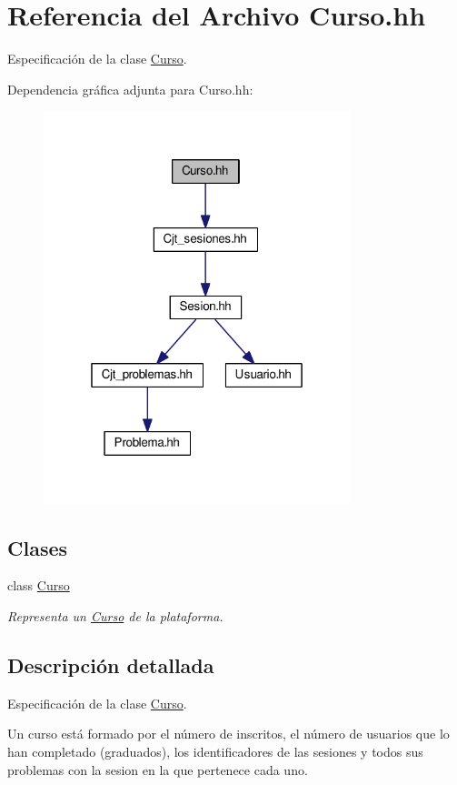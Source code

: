 \hypertarget{_curso_8hh}{}\section{Referencia del Archivo Curso.\+hh}
\label{_curso_8hh}


Especificación de la clase \mbox{\hyperlink{class_curso}{Curso}}.  


Dependencia gráfica adjunta para Curso.\+hh\+:
\nopagebreak
\begin{figure}[H]
\begin{center}
\leavevmode
\includegraphics[width=253pt]{_curso_8hh__incl}
\end{center}
\end{figure}
\subsection*{Clases}
\begin{DoxyCompactItemize}
\item 
class \mbox{\hyperlink{class_curso}{Curso}}
\begin{DoxyCompactList}\small\item\em Representa un \mbox{\hyperlink{class_curso}{Curso}} de la plataforma. \end{DoxyCompactList}\end{DoxyCompactItemize}


\subsection{Descripción detallada}
Especificación de la clase \mbox{\hyperlink{class_curso}{Curso}}. 

Un curso está formado por el número de inscritos, el número de usuarios que lo han completado (graduados), los identificadores de las sesiones y todos sus problemas con la sesion en la que pertenece cada uno. 